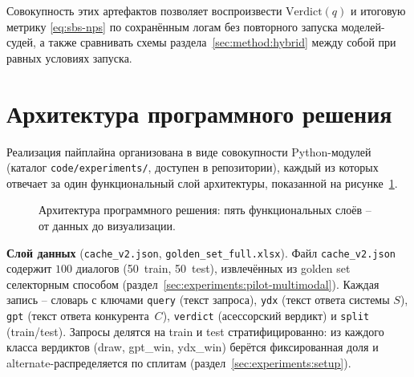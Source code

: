 Совокупность этих артефактов позволяет воспроизвести
$\mathrm{Verdict}(q)$ и итоговую метрику \eqref{eq:sbs-nps} по
сохранённым логам без повторного запуска моделей-судей, а также
сравнивать схемы раздела~\ref{sec:method:hybrid} между собой при равных
условиях запуска.

\section{Архитектура программного решения}
\label{sec:method:architecture}

Реализация пайплайна организована в виде совокупности Python-модулей
(каталог \texttt{code/experiments/}, доступен в репозитории),
каждый из которых отвечает за один функциональный слой архитектуры,
показанной на рисунке~\ref{fig:architecture}.

\begin{figure}[htbp]
    \centering
    \caption{Архитектура программного решения: пять функциональных
    слоёв -- от данных до визуализации.}
    \label{fig:architecture}
\end{figure}

\textbf{Слой данных} (\texttt{cache\_v2.json}, \texttt{golden\_set\_full.xlsx}).
Файл \texttt{cache\_v2.json} содержит $100$ диалогов (50~train, 50~test),
извлечённых из golden set селекторным способом
(раздел~\ref{sec:experiments:pilot-multimodal}).
Каждая запись -- словарь с ключами \texttt{query} (текст запроса),
\texttt{ydx} (текст ответа системы $S$), \texttt{gpt} (текст ответа
конкурента~$C$), \texttt{verdict} (асессорский вердикт) и
\texttt{split} (train/test).
Запросы делятся на train и test стратифицированно: из каждого класса
вердиктов (draw, gpt\_win, ydx\_win) берётся фиксированная доля и
alternate-распределяется по сплитам (раздел~\ref{sec:experiments:setup}).

